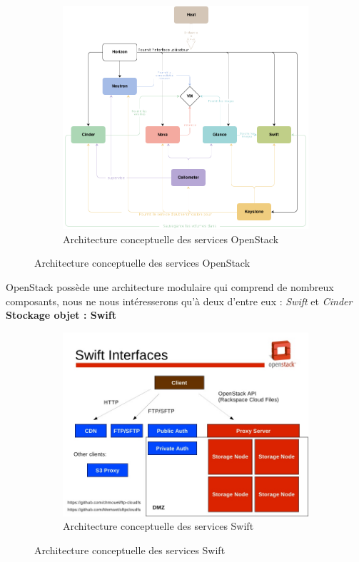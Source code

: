 \documentclass{article}
\begin{document}
\begin{figure}[h!]
	\centering
  	\begin{subfigure}[b]{0.85\linewidth}
	\includegraphics[width=\linewidth]{openstack.png}
	\caption{Architecture conceptuelle des services OpenStack}
  	\end{subfigure}
\end{figure}
\newpage
OpenStack possède une architecture modulaire qui comprend de nombreux composants, nous ne nous intéresserons qu'à deux d'entre eux : \textit{Swift} et \textit{Cinder}
\newline
\newline
\textbf{Stockage objet : Swift}

\begin{figure}[h!]
	\centering
  	\begin{subfigure}[b]{1.0\linewidth}
	\includegraphics[width=\linewidth]{swift.jpeg}
	\caption{Architecture conceptuelle des services Swift}
  	\end{subfigure}
\end{figure}
\end{document}

